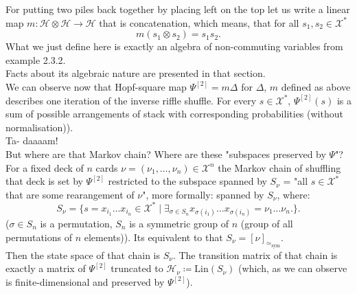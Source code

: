 \documentclass[a4paper, 12pt]{report}
\newcommand{\SimeqSym}{{\simeq_\mathrm{sym}}}
\begin{document}
For putting two piles back together by placing left on the top let us write a linear map
$m : \mathcal{H} \otimes \mathcal{H} \to \mathcal{H}$ that is concatenation, which means, that
for all $s_1, s_2 \in \mathcal{X}^*$
\begin{equation*}
m(s_1 \otimes s_2) = s_1s_2.
\end{equation*}
What we just define here is exactly an algebra of non-commuting variables from example
2.3.2.\\
Facts about its algebraic nature are presented in that section. \\
We can observe now that Hopf-square map $\Psi^{[2]} = m\Delta$ for $\Delta$, $m$ defined as above
describes one iteration of the inverse riffle shuffle. For every $s \in \mathcal{X}^*$, $\Psi^{[2]}(s)$ is
a sum of possible arrangements of stack with corresponding probabilities (without normalisation)).
\\ Ta- daaaam! \\[4pt]
But where are that Markov chain? Where are these "subspaces preserved by $\Psi$"? \\
For a fixed deck of $n$ cards $\nu = (\nu_1, \dots, \nu_n) \in \mathcal{X}^n$ the Markov chain of shuffling
that deck is set by $\Psi^{[2]}$ restricted to the subspace spanned by $S_\nu$ = "all $s \in \mathcal{X}^*$
that are some rearangement of $\nu$", more formally: spanned by $S_\nu$, where:
\begin{equation*}
S_\nu = \{ s = x_{i_1}\dots x_{i_n} \in \mathcal{X}^* \mid
\exists_{\sigma \in S_n} x_{\sigma(i_1)}\dots x_{\sigma(i_n)} = \nu_1\dots \nu_n. \}.
\end{equation*}
($\sigma \in S_n$ is a permutation, $S_n$ is a symmetric group of $n$ (group of
all permutations of $n$ elements)). Its equivalent to that $S_\nu = [\nu]_\SimeqSym$.\\
Then the state space of that chain is $S_\nu$. The transition matrix of that chain is exactly a matrix of
$\Psi^{[2]}$ truncated to $\mathcal{H}_\nu \coloneqq \mathrm{Lin}(S_\nu)$
(which, as we can observe is finite-dimensional and preserved by $\Psi^{[2]}$). \\[8pt]
\end{document}
